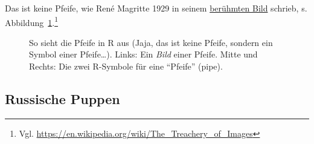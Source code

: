 \documentclass[
  a4paper,
]{scrbook}
\theoremstyle{definition}
\theoremstyle{definition}
\theoremstyle{definition}
\theoremstyle{remark}
\begin{document}
Das ist keine Pfeife, wie René Magritte 1929 in seinem
\href{https://en.wikipedia.org/wiki/File:MagrittePipe.jpg}{berühmten
Bild} schrieb, s. Abbildung~\ref{fig-pfeifen}.\footnote{Vgl.
  \url{https://en.wikipedia.org/wiki/The_Treachery_of_Images}}

\begin{figure}


\caption{\label{fig-pfeifen}So sieht die Pfeife in R aus (Jaja, das ist
keine Pfeife, sondern ein Symbol einer Pfeife\ldots). Links: Ein
\emph{Bild} einer Pfeife. Mitte und Rechts: Die zwei R-Symbole für eine
``Pfeife'' (pipe).}

\end{figure}%

\subsection{Russische Puppen}\label{russische-puppen}
\end{document}
